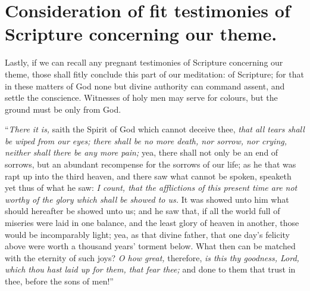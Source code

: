 \section{Consideration of fit testimonies of Scripture concerning our theme.}
Lastly, if we can recall any pregnant testimonies of Scripture concerning our theme, those shall fitly conclude this part of our meditation: of Scripture; for that in these matters of God none but divine authority can command assent, and settle the conscience. Witnesses of holy men may serve for colours, but the ground must be only from God. 

``\emph{There it is,} saith the Spirit of God which cannot deceive thee, \emph{that all tears shall be wiped from our eyes; there shall be no more death, nor sorrow, nor crying, neither shall there be any more pain;} yea, there shall not only be an end of sorrows, but an abundant recompense for the sorrows of our life; as he that was rapt up into the third heaven, and there saw what cannot be spoken, speaketh yet thus of what he saw: \emph{I count, that the afflictions of this present time are not worthy of the glory which shall be showed to us.} It was showed unto him what should hereafter be showed unto us; and he saw that, if all the world full of miseries were laid in one balance, and the least glory of heaven in another, those would be incomparably light; yea, as that divine father, that one day's felicity above were worth a thousand years' torment below. What then can be matched with the eternity of such joys? \emph{O how great,} therefore, \emph{is this thy goodness, Lord, which thou hast laid up for them, that fear thee;} and done to them that trust in thee, before the sons of men!''
